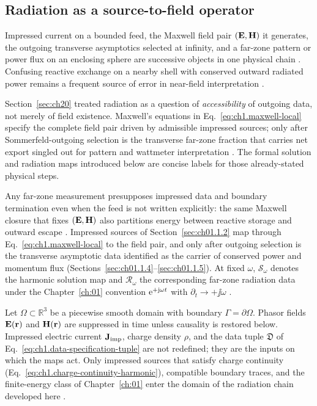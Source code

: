 \subsection{Radiation as a source-to-field operator}
\label{sec:ch201}

Impressed current on a bounded feed, the Maxwell field pair $(\mathbf{E},\mathbf{H})$ it generates, the outgoing transverse asymptotics selected at infinity, and a far-zone pattern or power flux on an enclosing sphere are successive objects in one physical chain \cite{maxwell1873,stratton1941}. Confusing reactive exchange on a nearby shell with conserved outward radiated power remains a frequent source of error in near-field interpretation \cite{poynting1884,stratton1941}.

Section~\ref{sec:ch20} treated radiation as a question of \emph{accessibility} of outgoing data, not merely of field existence. Maxwell's equations in Eq.~\eqref{eq:ch1.maxwell-local} specify the complete field pair driven by admissible impressed sources; only after Sommerfeld-outgoing selection is the transverse far-zone fraction that carries net export singled out for pattern and wattmeter interpretation \cite{stratton1941,sommerfeld1949}. The formal solution and radiation maps introduced below are concise labels for those already-stated physical steps.

Any far-zone measurement presupposes impressed data and boundary termination even when the feed
is not written explicitly: the same Maxwell closure that fixes \((\mathbf{E},\mathbf{H})\) also partitions
energy between reactive storage and outward escape \cite{stratton1941}. Impressed sources of
Section~\ref{sec:ch01.1.2} map through Eq.~\eqref{eq:ch1.maxwell-local} to the field pair, and
only after outgoing selection is the transverse asymptotic data identified as the carrier of
conserved power and momentum flux (Sections~\ref{sec:ch01.1.4}--\ref{sec:ch01.1.5}). At fixed
$\omega$, $\mathcal{S}_\omega$ denotes the harmonic solution map and $\mathcal{R}_\omega$ the
corresponding far-zone radiation data under the Chapter~\ref{ch:01} convention $\mathrm{e}^{+\mathrm{j}\omega t}$ with
$\partial_t\to+\jj\omega$ \cite{stratton1941}.

Let \(\Omega\subset\mathbb{R}^{3}\) be a piecewise smooth domain with boundary
\(\Gamma=\partial\Omega\). Phasor fields \(\mathbf{E}(\mathbf{r})\) and \(\mathbf{H}(\mathbf{r})\)
are suppressed in time unless causality is restored below. Impressed electric
current \(\mathbf{J}_{\mathrm{imp}}\), charge density \(\rho\), and the data tuple \(\mathfrak{D}\) of
Eq.~\eqref{eq:ch1.data-specification-tuple} are not redefined; they are the
inputs on which the maps act. Only impressed sources that satisfy charge continuity
(Eq.~\eqref{eq:ch1.charge-continuity-harmonic}), compatible boundary traces, and the
finite-energy class of Chapter~\ref{ch:01} enter the domain of the radiation chain
developed here \cite{stratton1941}.

